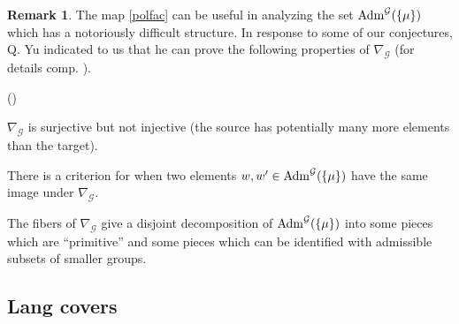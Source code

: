 \documentclass[reqno, 10pt]{amsart}
\newcommand{\CG}{\ensuremath{\mathcal {G}}\xspace}
\theoremstyle{definition}
\newtheorem{remark}[subsubsection]{Remark}
\newenvironment{altenumerate}
   {\begin{list}
      {\textup{(\theenumi)} }
      {\usecounter{enumi}
       \setlength{\labelwidth}{0pt}
       \setlength{\labelsep}{0pt}
       \setlength{\leftmargin}{0pt}
       \setlength{\itemsep}{\the\smallskipamount}
       \renewcommand{\theenumi}{\roman{enumi}}
      }}
   {\end{list}}
\numberwithin{equation}{subsection}
\numberwithin{subsubsection}{subsection}
\newcommand{\Adm}{{\rm {Adm}}}
\begin{document}
\begin{remark}\label{rem:yu}
 The map \eqref{polfac} can be useful in analyzing the set $ {\rm Adm}^\CG(\{\mu\})$ which has a notoriously difficult structure. In response to some of our conjectures, Q. Yu indicated to us that he can prove the following properties of  $\nabla_\CG$ (for details comp. \cite{Yu}). 
 \begin{altenumerate}
 \item $\nabla_\CG$ is surjective but not injective  (the source has potentially many more elements than the target).
 \item There is a criterion for when two elements $w, w'\in\Adm^\CG(\{\mu\})$ have the same image under $\nabla_\CG$. 
 \item The fibers of $\nabla_\CG$ give a disjoint decomposition of ${\rm Adm}^\CG(\{\mu\})$ into some pieces which are ``primitive'' and some pieces which can be identified with admissible subsets of smaller groups.
 \end{altenumerate}
 \end{remark}
 
 \bigskip

\subsection{Lang covers}
\end{document}
